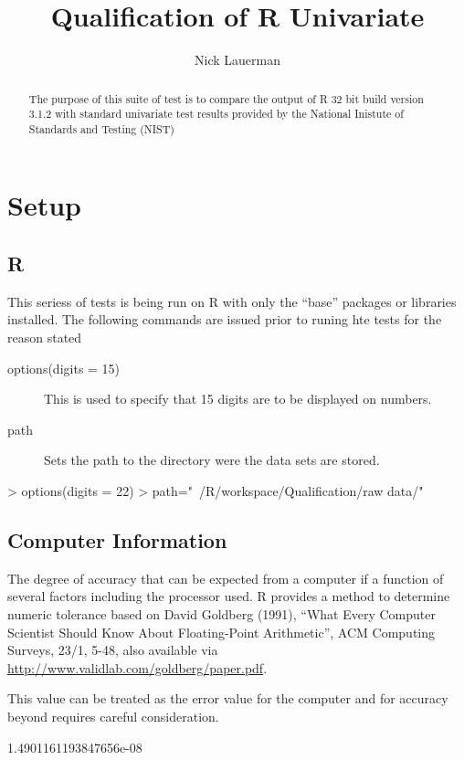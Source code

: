 \documentclass[10pt]{article}
\title{Qualification of R Univariate}
\author{Nick Lauerman}
\begin{document}

\maketitle

\begin{abstract}
The purpose of this suite of test is to compare the output of R 32 bit build
version 3.1.2 with standard univariate test results provided by the National
Inistute of Standards and Testing (NIST)
\end{abstract}

\tableofcontents

\section{Setup}
\subsection{R}
This seriess of tests is being run on R with only the ``base'' packages or libraries
installed. The following commands are issued prior to runing hte tests for the 
reason stated

\begin{description}
   \item[options(digits = 15)] This is used to specify that 15 digits are to be displayed
   on numbers.
   \item[path] Sets the path to the directory were the data sets are stored.
\end{description}
\begin{Schunk}
\begin{Sinput}
> options(digits = 22)
> path="~/R/workspace/Qualification/raw data/"
\end{Sinput}
\end{Schunk}
\subsection{Computer Information}

The degree of accuracy  that can be expected from a computer if a function of several
factors including the processor used. R provides a method to determine 
numeric tolerance based on David Goldberg (1991), 
``What Every Computer Scientist Should Know About Floating-Point Arithmetic'', 
ACM Computing Surveys, 23/1, 5-48, also available via 
\url{http://www.validlab.com/goldberg/paper.pdf}.

This value can be treated as the error value for the computer and for accuracy 
beyond requires careful consideration.
\begin{Schunk}
\begin{Soutput}
[1] 1.4901161193847656e-08
\end{Soutput}
\end{Schunk}
\end{document}

